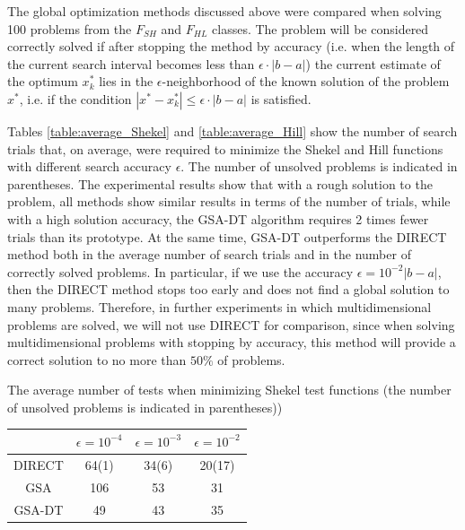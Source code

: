 \documentclass[entropy,article,submit,moreauthors,pdftex]{Definitions/mdpi}
\begin{document}
The global optimization methods discussed above were compared when solving 100 problems from the  $F_{SH}$ and $F_{HL}$ classes. The problem will be considered correctly solved if after stopping the method by accuracy (i.e. when the length of the current search interval becomes less than $\epsilon \cdot \left|b-a\right| $) the current estimate of the optimum  $x_k^*$ lies in the $\epsilon$-neighborhood of the known solution of the problem  $x^*$, i.e. if the condition  $|x^*-x_k^*| \leq \epsilon \cdot \left|b-a\right|$ is satisfied.

Tables \ref{table:average_Shekel} and \ref{table:average_Hill} show the number of search trials that, on average, were required to minimize the Shekel and Hill functions with different search accuracy  $\epsilon$. The number of unsolved problems is indicated in parentheses. The experimental results show that with a rough solution to the problem, all methods show similar results in terms of the number of trials, while with a high solution accuracy, the GSA-DT algorithm requires 2 times fewer trials than its prototype. At the same time, GSA-DT outperforms the DIRECT method both in the average number of search trials and in the number of correctly solved problems. In particular, if we use the accuracy $\epsilon = 10^{-2}\left|b-a\right|$, then the DIRECT method stops too early and does not find a global solution to many problems. 
Therefore, in further experiments in which multidimensional problems are solved, we will not use DIRECT for comparison, since when solving multidimensional problems with stopping by accuracy, this method will provide a correct solution to no more than  $50\%$ of problems. 

\begin{specialtable}[H] 
	\caption{The average number of tests when minimizing Shekel test functions (the number of unsolved problems is indicated in parentheses))}\label{table:average_Shekel}
	\center
\begin{tabular}{cccc}
\toprule
        & \textbf{$\epsilon = 10^{-4}$} & \textbf{$\epsilon = 10^{-3}$} & \textbf{$\epsilon = 10^{-2}$} \\
\midrule													
DIRECT         & 64(1) &  34(6)   & 20(17)    \\
GSA            & 106  & 53  &  31   \\ 
GSA-DT         & 49   & 43  &  35   \\

\bottomrule
\end{tabular}
\end{specialtable}
\end{document}
